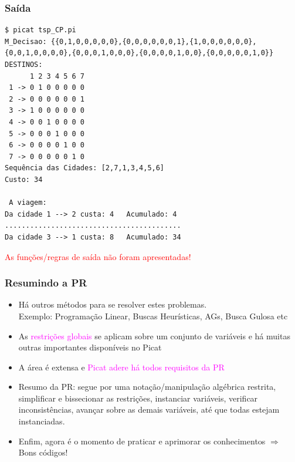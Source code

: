 \begin{frame}[fragile]
 \frametitle{Saída}

\begin{footnotesize}
\begin{verbatim}
$ picat tsp_CP.pi 
M_Decisao: {{0,1,0,0,0,0,0},{0,0,0,0,0,0,1},{1,0,0,0,0,0,0},{0,0,1,0,0,0,0},{0,0,0,1,0,0,0},{0,0,0,0,1,0,0},{0,0,0,0,0,1,0}}
DESTINOS:
      1 2 3 4 5 6 7 
 1 -> 0 1 0 0 0 0 0 
 2 -> 0 0 0 0 0 0 1 
 3 -> 1 0 0 0 0 0 0 
 4 -> 0 0 1 0 0 0 0 
 5 -> 0 0 0 1 0 0 0 
 6 -> 0 0 0 0 1 0 0 
 7 -> 0 0 0 0 0 1 0 
Sequência das Cidades: [2,7,1,3,4,5,6]
Custo: 34

 A viagem: 
Da cidade 1 --> 2 custa: 4	 Acumulado: 4
..........................................
Da cidade 3 --> 1 custa: 8	 Acumulado: 34
\end{verbatim}
\end{footnotesize}

\textcolor{red}{As funções/regras de saída não
foram apresentadas!}

\end{frame}






\begin{frame}[fragile]
\frametitle{Resumindo a PR}

\begin{itemize}
  \item Há outros métodos para se resolver estes problemas.\\
  Exemplo: Programação Linear, Buscas Heurísticas, AGs, Busca Gulosa  etc

  \pause  
  \item As \textcolor{magenta}{restrições globais} se aplicam sobre um conjunto de variáveis
  e há muitas outras importantes disponíveis no Picat

  \pause
  \item A área é extensa e \textcolor{magenta}{Picat adere há todos requisitos da PR}

  \pause
  \item Resumo da PR: segue por uma notação/manipulação algébrica restrita,
        simplificar e bissecionar as restrições, instanciar variáveis, 
        verificar inconsistências,   avançar sobre as demais variáveis, até que todas 
        estejam instanciadas.
  
  \pause
  \item Enfim, agora é o momento de praticar e aprimorar os conhecimentos $\Rightarrow$ Bons códigos!

\end{itemize}
\end{frame}
